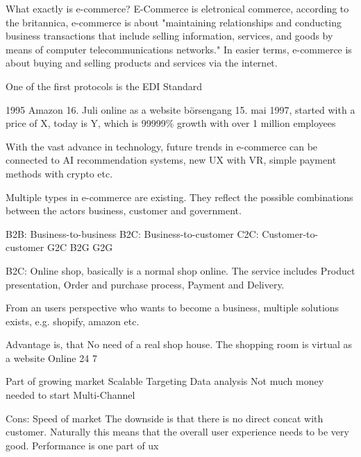
What exactly is e-commerce?
E-Commerce is eletronical commerce, according to the britannica, e-commerce is about "maintaining relationships and conducting business transactions that include selling information, services, and goods by means of computer telecommunications networks."
In easier terms, e-commerce is about buying and selling products and services via the internet.


One of the first protocols is the EDI Standard

1995 Amazon 16. Juli online as a website
börsengang 15. mai 1997, started with a price of X, today is Y, which is 99999\% growth
with over 1 million employees



With the vast advance in technology, future trends in e-commerce can be connected to AI recommendation systems, new UX with VR, simple payment methods with crypto etc.





Multiple types in e-commerce are existing. They reflect the possible combinations between the actors business, customer and government.

B2B: Business-to-business
B2C: Business-to-customer
C2C: Customer-to-customer
G2C
B2G
G2G





B2C: Online shop, basically is a normal shop online.
The service includes Product presentation, Order and purchase process, Payment and Delivery.


From an users perspective who wants to become a business, multiple solutions exists, e.g. shopify, amazon etc.



Advantage is, that No need of a real shop house. The shopping room is virtual as a website
Online 24 7

Part of growing market
Scalable
Targeting
Data analysis
Not much money needed to start
Multi-Channel

Cons: Speed of market
The downside is that there is no direct concat with customer.
Naturally this means that the overall user experience needs to be very good.
Performance is one part of ux


